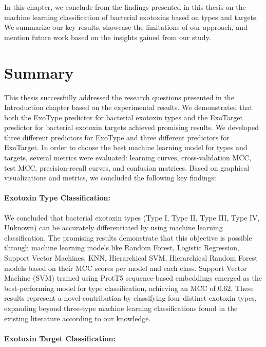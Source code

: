 In this chapter, we conclude from the findings presented in this thesis on the machine learning classification of bacterial exotoxins based on types and targets. We summarize our key results, showcase the limitations of our approach, and mention future work based on the insights gained from our study.


\section{Summary}

This thesis successfully addressed the research questions presented in the Introduction chapter based on the experimental results.
We demonstrated that both the ExoType predictor for bacterial exotoxin types and the ExoTarget predictor for bacterial exotoxin targets achieved promising results.
We developed three different predictors for ExoType and three different predictors for ExoTarget.
In order to choose the best machine learning model for types and targets, several metrics were evaluated: learning curves, cross-validation \gls{MCC}, test \gls{MCC}, precision-recall curves, and confusion matrices.
Based on graphical visualizations and metrics, we concluded the following key findings:


\paragraph{Exotoxin Type Classification:}

We concluded that bacterial exotoxin types (Type I, Type II, Type III, Type IV, Unknown) can be accurately differentiated by using machine learning classification. The promising results demonstrate that this objective is possible through machine learning models like Random Forest, Logistic Regression, Support Vector Machines,  \gls{KNN}, Hierarchical  \gls{SVM}, Hierarchical Random Forest models based on their  \gls{MCC} scores per model and each class.
Support Vector Machine (\gls{SVM}) trained using \gls{ProtT5} sequence-based embeddings emerged as the best-performing model for type classification, achieving an MCC of 0.62.
These results represent a novel contribution by classifying four distinct exotoxin types, expanding beyond three-type machine learning classifications found in the existing literature according to our knowledge.

\paragraph{Exotoxin Target Classification:}


